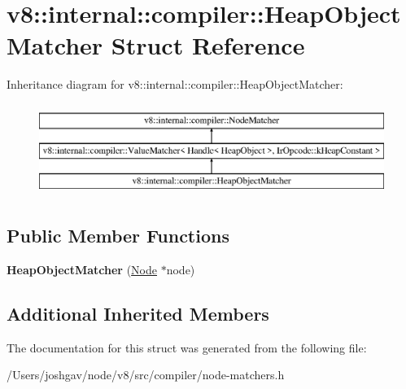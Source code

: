 \hypertarget{structv8_1_1internal_1_1compiler_1_1_heap_object_matcher}{}\section{v8\+:\+:internal\+:\+:compiler\+:\+:Heap\+Object\+Matcher Struct Reference}
\label{structv8_1_1internal_1_1compiler_1_1_heap_object_matcher}
Inheritance diagram for v8\+:\+:internal\+:\+:compiler\+:\+:Heap\+Object\+Matcher\+:\begin{figure}[H]
\begin{center}
\leavevmode
\includegraphics[height=3.000000cm]{structv8_1_1internal_1_1compiler_1_1_heap_object_matcher}
\end{center}
\end{figure}
\subsection*{Public Member Functions}
\begin{DoxyCompactItemize}
\item 
{\bfseries Heap\+Object\+Matcher} (\hyperlink{classv8_1_1internal_1_1compiler_1_1_node}{Node} $\ast$node)\hypertarget{structv8_1_1internal_1_1compiler_1_1_heap_object_matcher_a12f5ba19862844aeb1cdd34a9cfadaf3}{}\label{structv8_1_1internal_1_1compiler_1_1_heap_object_matcher_a12f5ba19862844aeb1cdd34a9cfadaf3}

\end{DoxyCompactItemize}
\subsection*{Additional Inherited Members}


The documentation for this struct was generated from the following file\+:\begin{DoxyCompactItemize}
\item 
/\+Users/joshgav/node/v8/src/compiler/node-\/matchers.\+h\end{DoxyCompactItemize}
